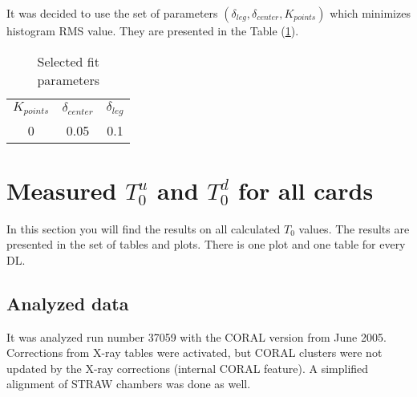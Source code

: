 \documentclass[a4paper,12pt]{article}
\begin{document}
It was decided to use the set of parameters $(\delta_{leg},\delta_{center},K_{points})$
which minimizes histogram RMS value. They are presented in the Table (\ref{tbl:fit parameters}).

\begin{table}[ht]
\centering
\caption{Selected fit parameters}
\label{tbl:fit parameters}
\begin{tabular}{|c|c|c|} \hline
$K_{points}$ & $\delta_{center}$ & $\delta_{leg}$ \\
 0 & 0.05  & 0.1   \\
\hline
\end{tabular}
\end{table}

\clearpage
\section{Measured $T_0^u$ and $T_0^d$ for all cards}

In this section you will find the results on all calculated $T_0$ values.
The results are presented in the set of tables and plots. There is one plot and
one table for every DL.

\subsection{Analyzed data}
It was analyzed run number 37059 with the CORAL version from June 2005. Corrections
from X-ray tables were activated, but CORAL clusters were not updated by the X-ray
corrections (internal CORAL feature). A simplified alignment of STRAW chambers was
done as well.
\end{document}
